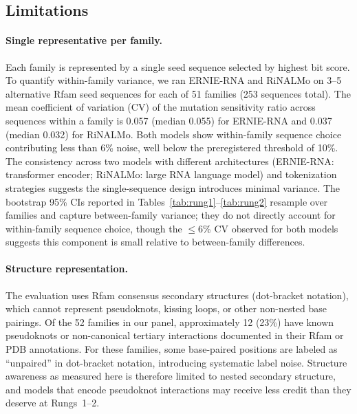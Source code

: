 \documentclass[11pt]{article}
\begin{document}
\subsection{Limitations}
\label{sec:limitations}

\paragraph{Single representative per family.}
Each family is represented by a single seed sequence selected by
highest bit score. To quantify within-family variance, we ran
ERNIE-RNA and RiNALMo on 3--5 alternative Rfam seed sequences for
each of 51 families (253 sequences total). The mean coefficient of
variation (CV) of the mutation sensitivity ratio across sequences
within a family is 0.057 (median 0.055) for ERNIE-RNA and 0.037
(median 0.032) for RiNALMo. Both models show within-family
sequence choice contributing less than 6\% noise, well below the
preregistered threshold of 10\%. The consistency across two models
with different architectures (ERNIE-RNA: transformer encoder;
RiNALMo: large RNA language model) and tokenization strategies
suggests the single-sequence design introduces minimal variance.
The bootstrap 95\% CIs reported in
Tables~\ref{tab:rung1}--\ref{tab:rung2} resample over families and
capture between-family variance; they do not directly account for
within-family sequence choice, though the $\leq$6\% CV observed
for both models suggests this component is small relative to
between-family differences.

\paragraph{Structure representation.}
The evaluation uses Rfam consensus secondary structures (dot-bracket
notation), which cannot represent pseudoknots, kissing loops, or
other non-nested base pairings. Of the 52 families in our panel,
approximately 12 (23\%) have known pseudoknots or non-canonical
tertiary interactions documented in their Rfam or PDB annotations.
For these families, some base-paired positions are labeled as
``unpaired'' in dot-bracket notation, introducing systematic label
noise. Structure awareness as measured here is therefore limited to
nested secondary structure, and models that encode pseudoknot
interactions may receive less credit than they deserve at Rungs~1--2.
\end{document}
